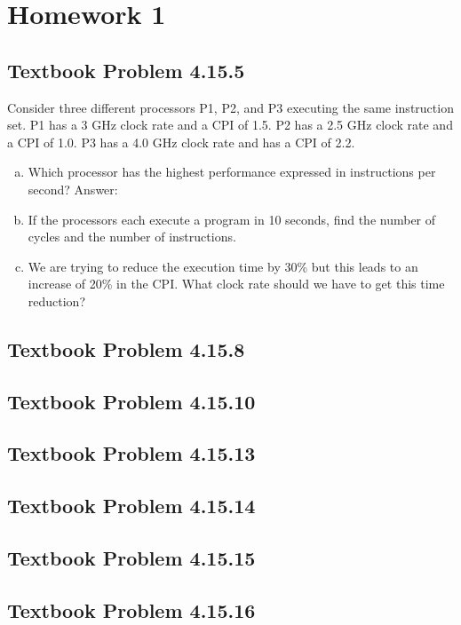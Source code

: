 \documentclass[12pt]{article}
\begin{document}
\section{Homework 1}
\subsection{Textbook Problem 4.15.5}
Consider three different processors P1, P2, and P3 executing the same instruction set. P1 has a 3 GHz clock rate and a CPI of 1.5. P2 has a 2.5 GHz clock rate and a CPI of 1.0. P3 has a 4.0 GHz clock rate and has a CPI of 2.2.

\begin{enumerate}[(a)]
\item Which processor has the highest performance expressed in instructions per second?
Answer:
\begin{center}

\end{center}
\item If the processors each execute a program in 10 seconds, find the number of cycles and the number of instructions.
\item We are trying to reduce the execution time by 30\% but this leads to an increase of 20\% in the CPI. What clock rate should we have to get this time reduction?
\end{enumerate}




\subsection{Textbook Problem 4.15.8}
\subsection{Textbook Problem 4.15.10}
\subsection{Textbook Problem 4.15.13}
\subsection{Textbook Problem 4.15.14}
\subsection{Textbook Problem 4.15.15}
\subsection{Textbook Problem 4.15.16}
\end{document}
